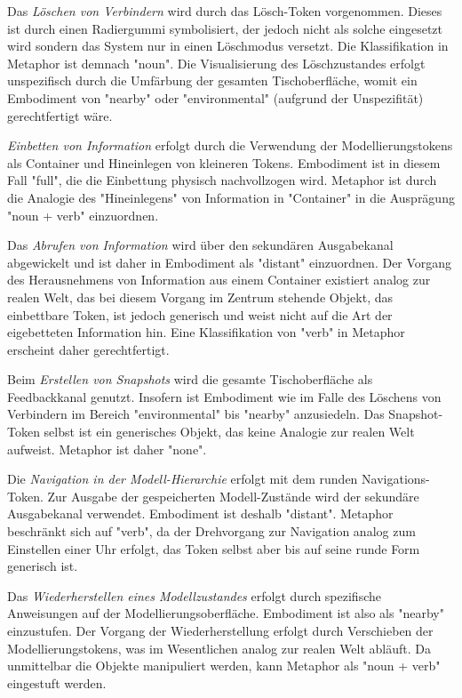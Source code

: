 Das \emph{Löschen von Verbindern} wird durch das Lösch-Token vorgenommen. Dieses ist durch einen Radiergummi symbolisiert, der jedoch nicht als solche eingesetzt wird sondern das System nur in einen Löschmodus versetzt. Die Klassifikation in Metaphor ist demnach "noun". Die Visualisierung des Löschzustandes erfolgt unspezifisch durch die Umfärbung der gesamten Tischoberfläche, womit ein Embodiment von "nearby" oder "environmental" (aufgrund der Unspezifität) gerechtfertigt wäre.

\emph{Einbetten von Information} erfolgt durch die Verwendung der Modellierungstokens als Container und Hineinlegen von kleineren Tokens. Embodiment ist in diesem Fall "full", die die Einbettung physisch nachvollzogen wird. Metaphor ist durch die Analogie des "Hineinlegens" von Information in "Container" in die Ausprägung "noun + verb" einzuordnen.

Das \emph{Abrufen von Information} wird über den sekundären Ausgabekanal abgewickelt und ist daher in Embodiment als "distant" einzuordnen. Der Vorgang des Herausnehmens von Information aus einem Container existiert analog zur realen Welt, das bei diesem Vorgang im Zentrum stehende Objekt, das einbettbare Token, ist jedoch generisch und weist nicht auf die Art der eigebetteten Information hin. Eine Klassifikation von "verb" in Metaphor erscheint daher gerechtfertigt.

Beim \emph{Erstellen von Snapshots} wird die gesamte Tischoberfläche als Feedbackkanal genutzt. Insofern ist Embodiment wie im Falle des Löschens von Verbindern im Bereich "environmental" bis "nearby" anzusiedeln. Das Snapshot-Token selbst ist ein generisches Objekt, das keine Analogie zur realen Welt aufweist. Metaphor ist daher "none".

Die \emph{Navigation in der Modell-Hierarchie} erfolgt mit dem runden Navigations-Token. Zur Ausgabe der gespeicherten Modell-Zustände wird der sekundäre Ausgabekanal
verwendet. Embodiment ist deshalb "distant". Metaphor beschränkt sich auf "verb", da der Drehvorgang zur Navigation analog zum Einstellen einer Uhr erfolgt, das Token selbst aber bis auf seine runde Form generisch ist.

Das \emph{Wiederherstellen eines Modellzustandes} erfolgt durch spezifische Anweisungen auf der Modellierungsoberfläche. Embodiment ist also als "nearby" einzustufen. Der Vorgang der Wiederherstellung erfolgt durch Verschieben der Modellierungstokens, was im Wesentlichen analog zur realen Welt abläuft. Da unmittelbar die Objekte manipuliert werden, kann Metaphor als "noun + verb" eingestuft werden.

